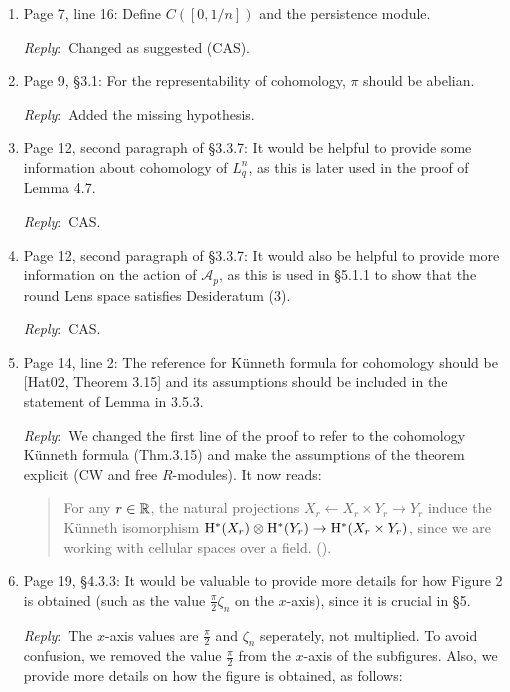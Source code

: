 \documentclass{amsart}
\newcommand{\ar}{\medskip\noindent\textit{Reply}:\ }
\begin{document}
\begin{enumerate}
		\item Page 7, line 16: Define $C([0, 1/n])$ and the persistence module.

		\ar Changed as suggested (CAS).

		\item Page 9, \S3.1: For the representability of cohomology, $\pi$ should be abelian.

		\ar Added the missing hypothesis.

		\item Page 12, second paragraph of \S3.3.7: It would be helpful to provide some information about cohomology of $L_q^n$, as this is later used in the proof of Lemma 4.7.

		\ar CAS.

		\item Page 12, second paragraph of \S3.3.7: It would also be helpful to provide more information on the action of $\mathcal{A}_p$, as this is used in \S5.1.1 to show that the round Lens space satisfies Desideratum (3).

		\ar CAS.

		\item Page 14, line 2: The reference for K\"unneth formula for cohomology should be [Hat02, Theorem 3.15] and its assumptions should be included in the statement of Lemma in 3.5.3.

		\ar We changed the first line of the proof to refer to the cohomology K\"unneth formula (Thm.3.15) and make the assumptions of the theorem explicit (CW and free \(R\)-modules).
		It now reads:

		\medskip
		\begin{quote}
			For any \(r \in \mathbb{R}\), the natural projections $X_r \leftarrow X_r \times Y_r \to Y_r$ induce the K\"unneth isomorphism $\mathrm{H}^*(X_r) \otimes \mathrm{H}^*(Y_r) \to \mathrm{H}^*(X_r \times Y_r)$, since we are working with cellular spaces over a field. (\cite[Thm.~3.15]{hatcher2000}).
		\end{quote}

		\item Page 19, \S4.3.3: It would be valuable to provide more details for how Figure 2 is obtained (such as the value $\frac{\pi}{2}\zeta_n$ on the $x$-axis), since it is crucial in \S5.

		\ar The $x$-axis values are $\frac{\pi}{2}$ and $\zeta_n$ seperately, not multiplied. To avoid confusion, we removed the value $\frac{\pi}{2}$ from the $x$-axis of the subfigures.
		Also, we provide more details on how the figure is obtained, as follows:


\end{enumerate}
\end{document}

